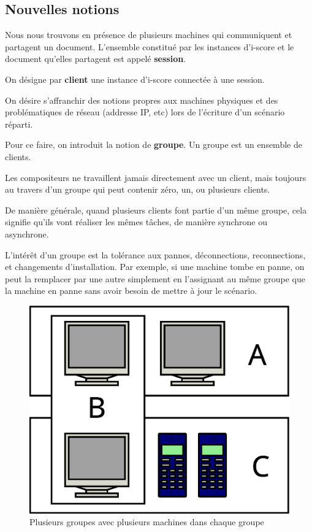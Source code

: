 \documentclass{article}
\newcommand\vocab[1]{\textbf{#1}}
\begin{document}
\subsection{Nouvelles notions}
Nous nous trouvons en présence de plusieurs machines qui communiquent et partagent un document.
L'ensemble constitué par les instances d'i-score et le document qu'elles partagent est appelé \vocab{session}.

On désigne par \vocab{client} une instance d'i-score connectée à une session.

On désire s'affranchir des notions propres aux machines physiques et des problématiques de réseau (addresse IP, etc) lors de l'écriture 
d'un scénario réparti. 

Pour ce faire, on introduit la notion de \vocab{groupe}. 
Un groupe est un ensemble de clients.

Les compositeurs ne travaillent jamais directement avec un client, mais toujours au travers d'un groupe qui peut contenir zéro, un, ou plusieurs clients.

De manière générale, quand plusieurs clients font partie d'un même groupe, cela signifie qu'ils vont réaliser les mêmes tâches, de manière synchrone ou asynchrone.

L'intérêt d'un groupe est la tolérance aux pannes, déconnections, reconnections, et changements d'installation. 
Par exemple, si une machine tombe en panne, on peut la remplacer par une autre simplement en l'assignant au même groupe que la machine en panne 
sans avoir besoin de mettre à jour le scénario.

\begin{figure}[h]
	\centering
	\includegraphics[scale=0.2]{images/groupes.eps}
	\caption{Plusieurs groupes avec plusieurs machines dans chaque groupe}
	\label{scenar.trigger-1}
\end{figure}
\end{document}
